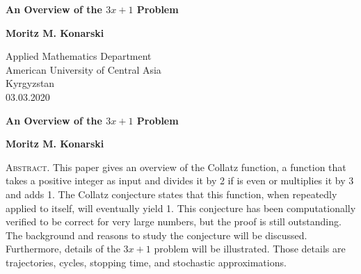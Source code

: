 \documentclass[12pt,a4paper,reqno]{amsart}
\newcommand{\name}{Moritz M. Konarski}
\newcommand{\datum}{03.03.2020}
\newcommand{\heading}{An Overview of the $3x+1$ Problem}
\begin{document}
\begin{titlepage}
    \begin{center}
        \vspace*{1cm}
            
        \Huge
        \textbf{\heading{}}
            
        \vspace{0.5cm}
            
        \vspace{1.5cm}
            
        \LARGE
        \textbf{\name{}}
            
        \vfill
            
            
        \vspace{0.8cm}
            
            
        \Large
        Applied Mathematics Department\\
        American University of Central Asia\\
        Kyrgyzstan\\
        \datum{}
            
    \end{center}
\end{titlepage}

\thispagestyle{plain}
\begin{center}
    \Large
    \textbf{\heading{}}
        
    \vspace{0.4cm}
    \large
        
    \vspace{0.4cm}
    \textbf{\name{}}
       
    \vspace{0.9cm}
\end{center}
\textsc{Abstract.} This paper gives an overview of the Collatz function, a 
function that takes
a positive integer as input and divides it by 2 if is even or multiplies
it by 3 and adds 1. The Collatz conjecture states that this function, when
repeatedly applied to itself, will eventually yield 1. This conjecture has
been computationally verified to be correct for very large numbers, but the
proof is still outstanding. The background and reasons to study the
conjecture will be discussed. Furthermore, details of the $3x+1$ problem
will be illustrated. Those details are trajectories, cycles, stopping time,
and stochastic approximations. 
\end{document}
